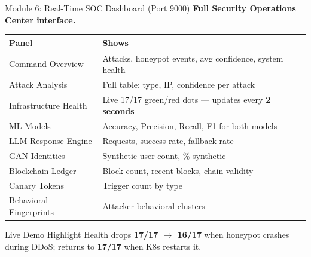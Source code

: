 \documentclass[aspectratio=169,12pt]{beamer}
\begin{document}
\begin{frame}{Module 6: Real-Time SOC Dashboard (Port 9000)}
  \textbf{\textcolor{dcCyan}{Full Security Operations Center interface.}}

  \vspace{0.3em}
  \centering\footnotesize
  \begin{tabular}{@{} l p{7.5cm} @{}}
    \toprule
    \rowcolor{dcMid}
    \textcolor{dcCyan}{Panel} & \textcolor{dcCyan}{Shows}\\
    \midrule
    Command Overview       & Attacks, honeypot events, avg confidence, system health\\
    \rowcolor{dcDark}
    Attack Analysis        & Full table: type, IP, confidence per attack\\
    Infrastructure Health  & Live 17/17 green/red dots --- updates every \textbf{2 seconds}\\
    \rowcolor{dcDark}
    ML Models              & Accuracy, Precision, Recall, F1 for both models\\
    LLM Response Engine    & Requests, success rate, fallback rate\\
    \rowcolor{dcDark}
    GAN Identities         & Synthetic user count, \% synthetic\\
    Blockchain Ledger      & Block count, recent blocks, chain validity\\
    \rowcolor{dcDark}
    Canary Tokens          & Trigger count by type\\
    Behavioral Fingerprints& Attacker behavioral clusters\\
    \bottomrule
  \end{tabular}

  \vspace{0.3em}
  \begin{block}{Live Demo Highlight}
    Health drops \textbf{17/17 $\rightarrow$ 16/17} when honeypot crashes during DDoS;
    returns to \textbf{17/17} when K8s restarts it.
  \end{block}
\end{frame}
\end{document}
